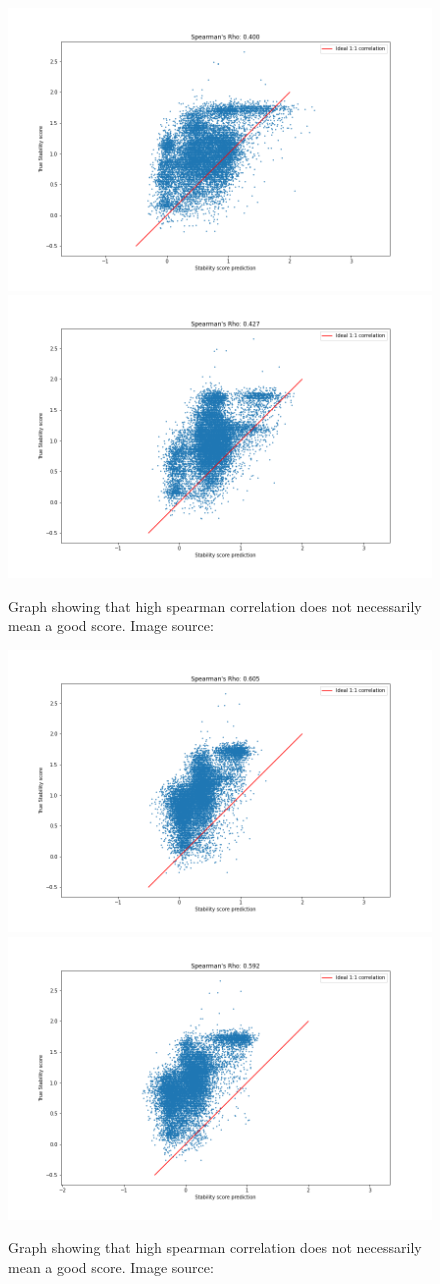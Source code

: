 \begin{figure}[!ht]
  \centering
  \includegraphics[width=0.4\linewidth]{latex/imgs/spearman_2_layer_no_drop_final.png}
  \includegraphics[width=0.4\linewidth]{latex/imgs/spearman_2_layer_no_drop_minloss.png}
  \caption{Graph showing that high spearman correlation does not necessarily mean a good score. Image source:\cite{spearman}}
\end{figure}
\begin{figure}[!ht]
  \centering
  \includegraphics[width=0.4\linewidth]{latex/imgs/spearman_1_layer_no_schedule_512_final.png}
  \includegraphics[width=0.4\linewidth]{latex/imgs/spearman_1_layer_no_schedule_512_minloss.png}
  \caption{Graph showing that high spearman correlation does not necessarily mean a good score. Image source:\cite{spearman}}
\end{figure}
